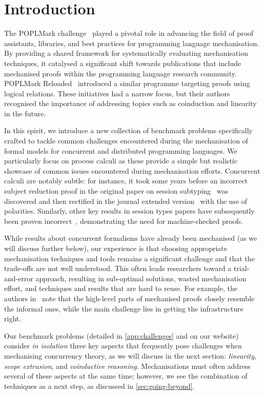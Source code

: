 \documentclass[runningheads]{llncs}
\begin{document}
\section{Introduction}
The POPLMark challenge~\cite{POPLMark}
played a pivotal role in advancing the field of proof assistants,
libraries, and best practices for programming language
mechanisation. By providing a shared framework for systematically
evaluating mechanisation techniques, it catalysed a significant
shift towards publications that include mechanised proofs within the programming language research community.
POPLMark Reloaded~\cite{POPLMarkReloaded} introduced a similar programme targeting proofs using logical relations.
These initiatives had a narrow focus, but their authors recognised the importance of addressing topics such as coinduction and linearity in the future.

In this spirit, we introduce a new collection of benchmark problems
specifically crafted to tackle common challenges encountered during
the mechanisation of formal models for concurrent and distributed
programming languages.  We particularly focus on process calculi as
these provide a simple but realistic showcase of common issues
encountered during mechanisation efforts.  Concurrent calculi are
notably subtle: for instance, it took some years before an incorrect
subject reduction proof in the original paper on session
subtyping~\cite{GH99} was discovered and then rectified in the journal
extended version~\cite{GH05} with the use of
polarities.
Similarly, other key results in session types papers have subsequently
been proven incorrect~\cite{Gay2020,10.1145/3290343}, demonstrating the
need for machine-checked proofs.

While results about concurrent
formalisms have already been mechanised (as we will discuss further
below), our experience is that choosing appropriate mechanisation
techniques and tools remains a significant challenge and that the
trade-offs are not well understood.  This often leads researchers
toward a trial-and-error approach, resulting in sub-optimal solutions,
wasted mechanisation effort, and techniques and results that are hard
to reuse. For example, the authors in~\cite{Cruz-Filipe2021b} note that the high-level parts of
mechanised proofs closely resemble the informal ones, while the
main challenge lies in getting the infrastructure right.

Our benchmark problems (detailed in \cref{app:challenges} and on our website) consider
\emph{in isolation} three key aspects that frequently pose challenges
when mechanising concurrency theory, as we will discuss in the next section: \emph{linearity}, \emph{scope
  extrusion}, and \emph{coinductive reasoning}.
Mechanisations must often address several of these aspects at the same time; however, we
see the combination of techniques as a next
step, as discussed in \cref{sec:going-beyond}.
\end{document}
